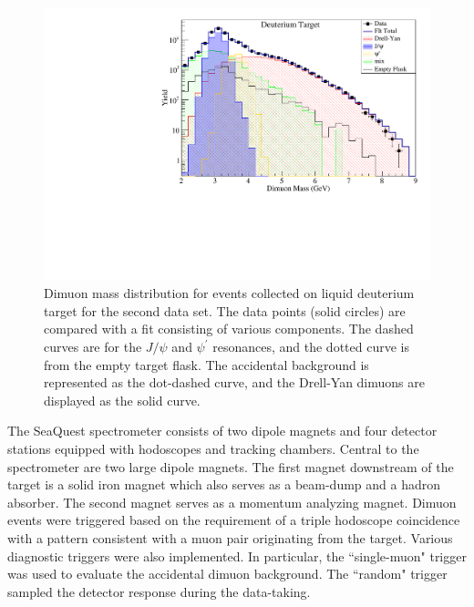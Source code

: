 \documentclass[reprint,aps,unsortedaddress,superscriptaddress,prl,floatfix,showpacs,linenumbers]{revtex4-2}
\begin{document}
\begin{figure}[tb]
	\includegraphics*[width=\linewidth]{massFit/massfit_LD2}
	\caption{Dimuon mass distribution for events collected
		on liquid deuterium target for the second data set.
		The data points (solid circles) are
		compared with a fit consisting of various components. The dashed curves are
		for the $J/\psi$ and $\psi^\prime$ resonances, and the dotted curve is from the
		empty target flask. The accidental background is represented as the
		dot-dashed curve, and the Drell-Yan dimuons are displayed as the solid curve.}
	\label{Fig:LD2_Mass}
\end{figure}


The SeaQuest spectrometer consists of two dipole magnets and
four detector stations equipped with hodoscopes and tracking chambers.
Central to the spectrometer are two large dipole magnets.
The first magnet downstream of the target is a solid iron magnet which
also serves as a beam-dump and a hadron absorber. The second
magnet serves as a momentum analyzing magnet. Dimuon events
were triggered based on the requirement of a triple hodoscope
coincidence with a pattern consistent with a muon pair originating
from the target. Various diagnostic triggers were also implemented.
In particular, the ``single-muon" trigger was used to evaluate the
accidental dimuon
background. The ``random" trigger sampled the
detector response during the data-taking.
\end{document}
